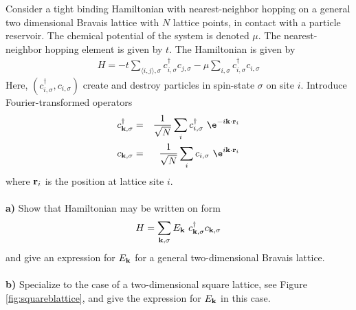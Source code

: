 \begin{problem}

Consider a tight binding Hamiltonian with nearest-neighbor hopping on a general two dimensional Bravais lattice with $N$ lattice points, in contact with a particle reservoir. The chemical potential of the system is denoted $\mu$. The nearest-neighbor hopping element is given by $t$. The Hamiltonian is given by 
\begin{eqnarray}
	H = - t \sum_{\langle i,j \rangle, \sigma} c^{\dagger}_{i,\sigma} c_{j,\sigma} - \mu   \sum_{ i, \sigma} c^{\dagger}_{i,\sigma} c_{i,\sigma} \nonumber 
\end{eqnarray}
Here, $(c^{\dagger}_{i,\sigma}, c_{i,\sigma})$ create and destroy particles in spin-state $\sigma$ on site $i$. 
Introduce Fourier-transformed operators 
\begin{eqnarray}
	c^{\dagger}_{{\bf k},\sigma} & = & \frac{1}{\sqrt{N}} \sum_{i} c^{\dagger}_{i,\sigma} ~ \e^{-i {\bf k} \cdot {\bf r}_i} \nonumber  \\
	c_{{\bf k},\sigma} & = & \frac{1}{\sqrt{N}} \sum_{i} c_{i,\sigma} ~ \e^{i {\bf k} \cdot {\bf r}_i} \nonumber
\end{eqnarray}
where ${\bf r}_i$ is the position at lattice site $i$. 
\ \\
\ \\
{\bf a)} Show that Hamiltonian may be written on form
\begin{eqnarray}
	H = \sum_{{\bf k}, \sigma} E_{\bf k} ~ c^{\dagger}_{{\bf k},\sigma} c_{{\bf k},\sigma}  \nonumber 
\end{eqnarray}
and give an expression for $E_{\bf k}$ for a general two-dimensional Bravais lattice. 
\ \\
\ \\
{\bf b)} Specialize to the case of a two-dimensional square lattice, see Figure \ref{fig:squareblattice}, and give the expression for $E_{\bf k}$ in this case.


\end{problem}
